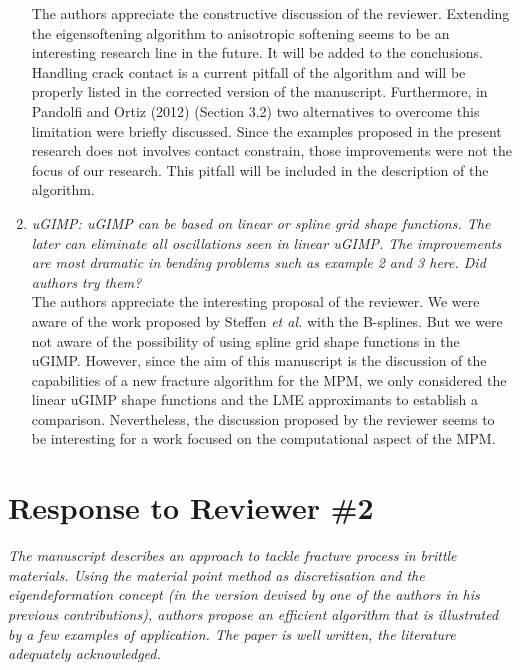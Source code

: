 \documentclass[12pt]{article}
\begin{document}
\begin{enumerate}
The authors appreciate the constructive discussion of the reviewer. Extending the eigensoftening algorithm to anisotropic softening seems to be an interesting research line in the future. It will be added to the conclusions. Handling crack contact is a current pitfall of the algorithm and will be properly listed in the corrected version of the manuscript. Furthermore, in Pandolfi and Ortiz (2012) \cite{Ortiz_Pandolfi_2012} (Section 3.2) two alternatives to overcome this limitation were briefly discussed. Since the examples proposed in the present research does not involves contact constrain, those improvements were not the focus of our research. This pitfall will be included in the description of the algorithm. 

\item \textit{uGIMP: uGIMP can be based on linear or spline grid shape functions. The later can eliminate all oscillations seen in linear uGIMP. The improvements are most dramatic in bending problems such as example 2 and 3 here. Did authors try them?}\\

The authors appreciate the interesting proposal of the reviewer. We were aware of the work proposed by Steffen {\it et al.} \cite{Steffen_2008} with the B-splines. But we were not aware of the possibility of using spline grid shape functions in the uGIMP. However, since the aim of this manuscript is the discussion of the capabilities of a new fracture algorithm for the MPM, we only considered the linear uGIMP shape functions and the LME approximants to establish a comparison. Nevertheless, the discussion proposed by the reviewer seems to be interesting for a work focused on the computational aspect of the MPM.

 \end{enumerate}

\hspace{5mm}



\section*{Response to Reviewer \#2}

\textit {The manuscript describes an approach to tackle fracture process in brittle materials. Using the material point method as discretisation and the eigendeformation concept (in the version devised by one of the authors in his previous contributions), authors propose an efficient algorithm that is illustrated by a few examples of application. The paper is well written, the literature adequately acknowledged. }\\
\end{document}

